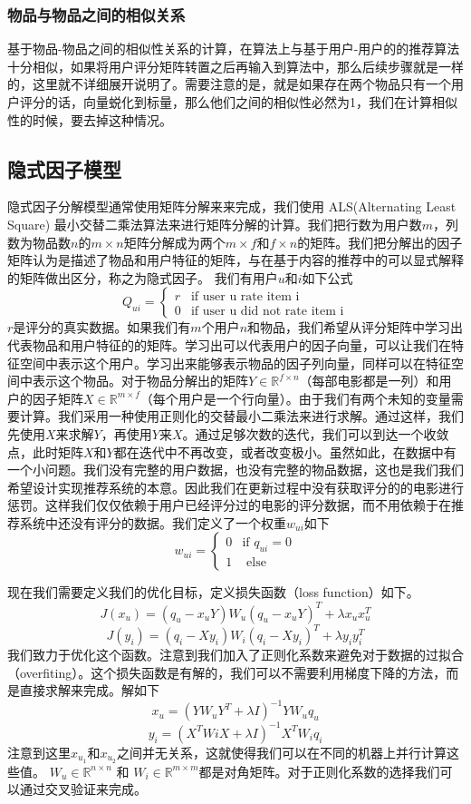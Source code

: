 \subsubsection{物品与物品之间的相似关系}
基于物品-物品之间的相似性关系的计算，在算法上与基于用户-用户的的推荐算法十分相似，如果将用户评分矩阵转置之后再输入到算法中，那么后续步骤就是一样的，这里就不详细展开说明了。需要注意的是，就是如果存在两个物品只有一个用户评分的话，向量蜕化到标量，那么他们之间的相似性必然为1，我们在计算相似性的时候，要去掉这种情况。

\subsection{隐式因子模型}
隐式因子分解模型通常使用矩阵分解来来完成，我们使用
ALS(Alternating Least Square) 最小交替二乘法\cite{Zachariah:2012hh}算法来进行矩阵分解的计算。我们把行数为用户数$m$，列数为物品数$n$的$m \times n$矩阵分解成为两个$m \times f$和$ f \times n$的矩阵。我们把分解出的因子矩阵认为是描述了物品和用户特征的矩阵，与在基于内容的推荐中的可以显式解释的矩阵做出区分，称之为隐式因子。
我们有用户$u$和$i$如下公式
$$
Q_{ui} = \begin{cases}
r  & \text{if user u rate item i} \\
0 & \text{if user u did not rate item i}
\end{cases}
$$
$r$是评分的真实数据。如果我们有$m$个用户$n$和物品，我们希望从评分矩阵中学习出代表物品和用户特征的的矩阵。学习出可以代表用户的因子向量，可以让我们在特征空间中表示这个用户。学习出来能够表示物品的因子列向量，同样可以在特征空间中表示这个物品。对于物品分解出的矩阵$Y \in \mathbb{R}^{f \times n}$（每部电影都是一列）和用户的因子矩阵$X \in \mathbb{R}^{m \times f}$（每个用户是一个行向量）。由于我们有两个未知的变量需要计算。我们采用一种使用正则化的交替最小二乘法来进行求解。通过这样，我们先使用$X$来求解$Y$，再使用$Y$来$X$。通过足够次数的迭代，我们可以到达一个收敛点，此时矩阵$X$和$Y$都在迭代中不再改变，或者改变极小。虽然如此，在数据中有一个小问题。我们没有完整的用户数据，也没有完整的物品数据，这也是我们我们希望设计实现推荐系统的本意。因此我们在更新过程中没有获取评分的的电影进行惩罚。这样我们仅仅依赖于用户已经评分过的电影的评分数据，而不用依赖于在推荐系统中还没有评分的数据。我们定义了一个权重$w_{ui}$如下
$$w_{ui} = \begin{cases}
0 &\text{if  } q_{ui} = 0 \\
1 & \text{ else} 
\end{cases}$$

现在我们需要定义我们的优化目标，定义损失函数（loss function）如下。
$$J(x_u) = (q_u - x_u Y) W_u (q_u - x_u Y)^T + \lambda x_u x_u^T$$
$$J(y_i) = (q_i - X y_i) W_i (q_i - X y_i)^T + \lambda y_i y_i^T$$
我们致力于优化这个函数。注意到我们加入了正则化系数来避免对于数据的过拟合（overfiting）。这个损失函数是有解的，我们可以不需要利用梯度下降的方法，而是直接求解来完成。解如下
$$x_u = (Y W_u Y^T + \lambda I)^{-1} Y W_u q_u$$
$$y_i = (X^T Wi X + \lambda I)^{-1} X^T W_i q_i$$
注意到这里$x_{u_1}$和$x_{u_2}$之间并无关系，这就使得我们可以在不同的机器上并行计算这些值。
$W_u \in \mathbb{R}^{n\times n}$ 和
$W_i \in \mathbb{R}^{m\times m}$都是对角矩阵。对于正则化系数的选择我们可以通过交叉验证来完成。

